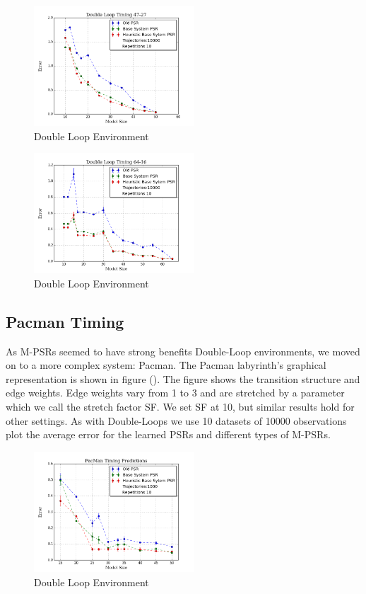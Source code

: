 \begin{figure}[ht!]
\centering
\includegraphics[width=60mm]{uCOREPICS/DoubleLoopTimingHeuristics47-27.png}
\caption{Double Loop Environment\label{overflow}}
\end{figure}

\begin{figure}[ht!]
\centering
\includegraphics[width=60mm]{uCOREPICS/DoubleLoop64-16Heuristics.png}
\caption{Double Loop Environment\label{overflow}}
\end{figure}

\subsection{Pacman Timing}

As M-PSRs seemed to have strong benefits Double-Loop environments, we moved on to a more complex system: Pacman. The Pacman labyrinth's graphical representation is shown in figure (). The figure shows the transition structure and edge weights. Edge weights vary from 1 to 3 and are stretched by a parameter which we call the stretch factor SF. We set SF at 10, but similar results hold for other settings. As with Double-Loops we use 10 datasets of 10000 observations plot the average error for the learned PSRs and different types of M-PSRs.

\begin{figure}[ht!]
\centering
\includegraphics[width=60mm]{uCOREPICS/PacManTimingHeuristicsIncluded.png}
\caption{Double Loop Environment\label{overflow}}
\end{figure}


